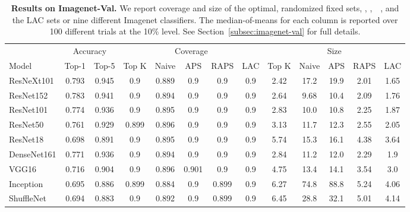 \begin{table}[t] 
\centering 
\small 
\begin{tabular}{lcccccccccccc} 
\toprule 
 & \multicolumn{2}{c}{Accuracy}  & \multicolumn{5}{c}{Coverage} & \multicolumn{5}{c}{Size} \\ 
\cmidrule(r){2-3}  \cmidrule(r){4-8}  \cmidrule(r){9-13} 
Model & Top-1 & Top-5 & Top K & Naive & APS & RAPS & LAC & Top K & Naive & APS & RAPS & LAC \\ 
\midrule 
 ResNeXt101 &  0.793 &  0.945 & 0.9 & 0.889 & 0.9 & 0.9 & 0.9 & 2.42 & 17.2 & 19.9 & 2.01 & 1.65 \\ 
 ResNet152 &  0.783 &  0.941 & 0.9 & 0.894 & 0.9 & 0.9 & 0.9 & 2.64 & 9.68 & 10.4 & 2.09 & 1.76 \\ 
 ResNet101 &  0.774 &  0.936 & 0.9 & 0.895 & 0.9 & 0.9 & 0.9 & 2.83 & 10.0 & 10.8 & 2.25 & 1.87 \\ 
 ResNet50 &  0.761 &  0.929 & 0.899 & 0.896 & 0.9 & 0.9 & 0.9 & 3.13 & 11.7 & 12.3 & 2.55 & 2.05 \\ 
 ResNet18 &  0.698 &  0.891 & 0.9 & 0.895 & 0.9 & 0.9 & 0.9 & 5.74 & 15.3 & 16.1 & 4.38 & 3.64 \\ 
 DenseNet161 &  0.771 &  0.936 & 0.9 & 0.894 & 0.9 & 0.9 & 0.9 & 2.84 & 11.2 & 12.0 & 2.29 & 1.9 \\ 
 VGG16 &  0.716 &  0.904 & 0.9 & 0.896 & 0.901 & 0.9 & 0.9 & 4.75 & 13.4 & 14.1 & 3.54 & 3.0 \\ 
 Inception &  0.695 &  0.886 & 0.899 & 0.884 & 0.9 & 0.899 & 0.9 & 6.27 & 74.8 & 88.8 & 5.24 & 4.06 \\ 
 ShuffleNet &  0.694 &  0.883 & 0.9 & 0.892 & 0.9 & 0.899 & 0.9 & 6.45 & 28.8 & 32.1 & 5.01 & 4.14 \\ 
\bottomrule 
\end{tabular} 
\caption{\textbf{Results on Imagenet-Val.} We report coverage and size of the optimal, randomized fixed sets, \naive, \aps,\ \raps\ , and the LAC sets or nine different Imagenet classifiers. The median-of-means for each column is reported over 100 different trials at the 10\% level. See Section~\ref{subsec:imagenet-val} for full details.} 
\label{table:imagenet-val-lei-wasserman} 
\end{table} 
